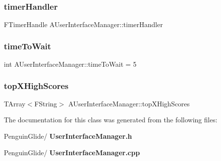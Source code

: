 \mbox{\label{class_a_user_interface_manager_ae5be8f5675d666a92f1db61f2179d798}} 
\subsubsection{timerHandler}
{\footnotesize\ttfamily F\+Timer\+Handle A\+User\+Interface\+Manager\+::timer\+Handler\hspace{0.3cm}{\ttfamily [private]}}

\mbox{\label{class_a_user_interface_manager_a918923fd6b4045dc865093346d6c1bee}} 
\subsubsection{timeToWait}
{\footnotesize\ttfamily int A\+User\+Interface\+Manager\+::time\+To\+Wait = 5\hspace{0.3cm}{\ttfamily [private]}}

\mbox{\label{class_a_user_interface_manager_a5d65eaac6630841ca0d92d42b28db560}} 
\subsubsection{topXHighScores}
{\footnotesize\ttfamily T\+Array$<$F\+String$>$ A\+User\+Interface\+Manager\+::top\+X\+High\+Scores\hspace{0.3cm}{\ttfamily [private]}}



The documentation for this class was generated from the following files\+:\begin{DoxyCompactItemize}
\item 
Penguin\+Glide/\textbf{ User\+Interface\+Manager.\+h}\item 
Penguin\+Glide/\textbf{ User\+Interface\+Manager.\+cpp}\end{DoxyCompactItemize}
